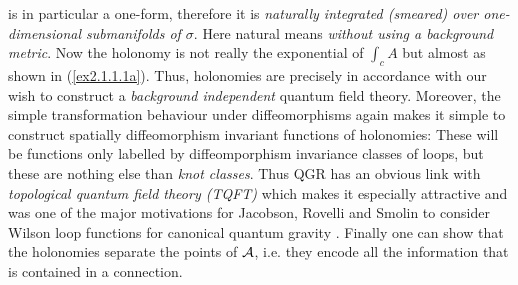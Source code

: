 \documentclass[12pt]{report}
\def\a{{\cal A}}
\begin{document}
is in particular a one-form, therefore it is {\it naturally integrated
(smeared) over one-dimensional submanifolds of $\sigma$}. Here natural 
means {\it without using a background metric}. Now the holonomy
is not really the exponential of $\int_c A$ but almost as shown
in (\ref{ex2.1.1.1a}). Thus, holonomies are precisely in accordance 
with our wish to construct a {\it background independent} quantum field 
theory. Moreover, the simple transformation behaviour under 
diffeomorphisms again makes it simple to construct spatially 
diffeomorphism invariant functions of holonomies: These will be 
functions only labelled by diffeomporphism invariance classes of 
loops, but these are nothing else than {\it knot classes}. Thus 
QGR has an obvious link with {\it topological quantum field theory (TQFT)}
\cite{28} which makes it especially attractive and was one of the major 
motivations for Jacobson, Rovelli and Smolin to consider Wilson loop 
functions for canonical quantum gravity \cite{29}. Finally one can show
\cite{30} that the holonomies separate the points of $\a$, i.e. they
encode all the information that is contained in a connection.
\end{document}

